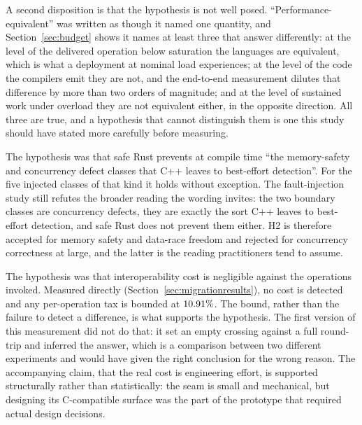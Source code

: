 \documentclass[english,twoside,openright,a4paper,censored,csm,software-track-2020]{HYthesisML}
\begin{document}
\begin{description}
        A second disposition is that the hypothesis is not well posed.
        ``Performance-equivalent'' was written as though it named one quantity, and
        Section~\ref{sec:budget} shows it names at least three that answer differently: at the
        level of the delivered operation below saturation the languages are equivalent, which
        is what a deployment at nominal load experiences; at the level of the code the
        compilers emit they are not, and the end-to-end measurement dilutes that difference by
        more than two orders of magnitude; and at the level of sustained work under overload
        they are not equivalent either, in the opposite direction. All three are true, and a
        hypothesis that cannot distinguish them is one this study should have stated more
        carefully before measuring.
  \item[H2: supported in its precise form, refuted in its loose one.] The hypothesis was
        that safe Rust prevents at compile time ``the memory-safety and concurrency defect
        classes that C++ leaves to best-effort detection''. For the five injected classes of
        that kind it holds without exception. The fault-injection study still refutes
        the broader reading the wording invites: the two boundary classes are concurrency
        defects, they are exactly the sort C++ leaves to best-effort detection, and safe Rust
        does not prevent them either. H2 is therefore accepted for memory safety and
        data-race freedom and rejected for concurrency correctness at large, and the latter is
        the reading practitioners tend to assume.
  \item[H3: supported, and tested the right way on the second attempt.] The hypothesis was
        that interoperability cost is negligible against the operations invoked. Measured
        directly (Section~\ref{sec:migrationresults}), no cost is detected and any per-operation
        tax is bounded at $10.91\%$. The bound, rather than the failure to detect a
        difference, is what supports the hypothesis. The first version of this measurement did
        not do that: it set an empty crossing against a full round-trip and inferred the
        answer, which is a comparison between two different experiments and would have given
        the right conclusion for the wrong reason. The accompanying claim, that the real cost
        is engineering effort, is supported structurally rather than statistically: the seam is
        small and mechanical, but designing its C-compatible surface was the part of the
        prototype that required actual design decisions.
\end{description}
\end{document}
